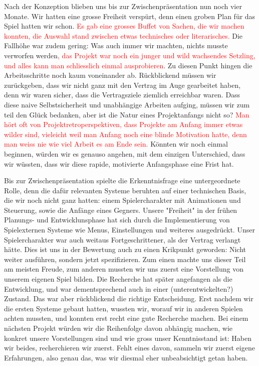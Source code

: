 \documentclass[../Main.tex]{subfiles}
\begin{document}
Nach der Konzeption blieben uns bis zur Zwischenpräsentation nun noch vier Monate. Wir hatten eine grosse Freiheit verspürt, denn einen groben Plan für das Spiel hatten wir schon. \textcolor{red}{Es gab eine grosses Buffet von Sachen, die wir machen konnten, die Auswahl stand zwischen etwas technisches oder literarisches.} Die Fallhöhe war zudem gering: Was auch immer wir machten, nichts musste verworfen werden\textcolor{red}{, das Projekt war noch ein junger und wild wachsendes Setzling, und alles kann man schliesslich einmal ausprobieren}. Zu diesen Punkt hingen die Arbeitsschritte noch kaum voneinander ab. Rückblickend müssen wir zurückgeben, dass wir nicht ganz mit den Vertrag im Auge gearbeitet haben, denn wir waren sicher, dass die Vertragsziele ziemlich erreichbar waren. Dass diese naive Selbstsicherheit und unabhängige Arbeiten aufging, müssen wir zum teil den Glück bedanken, aber ist die Natur eines Projektanfangs nicht so? \textcolor{red}{Man hört oft von Projektretroperspektiven, dass Projekte am Anfang immer etwas wilder sind, vieleicht weil man Anfang noch eine blinde Motivation hatte, denn man weiss nie wie viel Arbeit es am Ende sein.} Könnten wir noch einmal beginnen, würden wir es genauso angehen, mit dem einzigen Unterschied, dass wir wüssten, dass wir diese rapide, motivierte Anfangsphase eine Frist hat.

Bis zur Zwischenpräsentation spielte die Erkenntnisfrage eine untergeordnete Rolle, denn die dafür relevanten Systeme beruhten auf einer technischen Basis, die wir noch nicht ganz hatten: einem Spielercharakter mit Animationen und Steuerung, sowie die Anfänge eines Gegners. Unsere "Freiheit" in der frühen Planungs- und Entwicklunsphase hat sich durch die Implementierung von Spielexternen Systeme wie Menus, Einstellungen und weiteres ausgedrückt. Unser Spielercharakter war auch weitaus Fortgeschrittener, als der Vertrag verlangt hätte. Dies ist uns in der Bewertung auch zu einen Krikpunkt geworden: Nicht weiter ausführen, sondern jetzt spezifizieren. Zum einen machte uns dieser Teil am meisten Freude, zum anderen mussten wir uns zuerst eine Vorstellung von unserem eigenen Spiel bilden. Die Recherche hat später angefangen als die Entwicklung, und war dementsprechend auch in einer (unterentwickelten?) Zustand. Das war aber rückblickend die richtige Entscheidung. Erst nachdem wir die ersten Systeme gebaut hatten, wussten wir, worauf wir in anderen Spielen achten mussten, und konnten erst recht eine gute Recherche machen. Bei einem nächsten Projekt würden wir die Reihenfolge davon abhängig machen, wie konkret unsere Vorstellungen sind und wie gross unser Kenntnisstand ist: Haben wir beides, recherchieren wir zuerst. Fehlt eines davon, sammeln wir zuerst eigene Erfahrungen, also genau das, was wir diesmal eher unbeabsichtigt getan haben.
\end{document}
